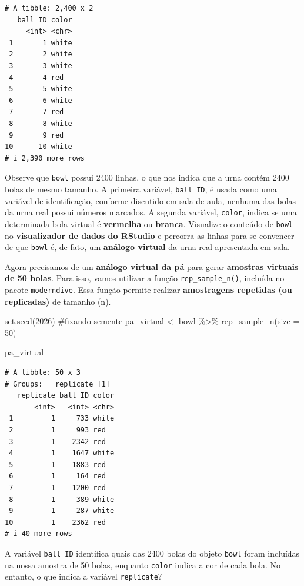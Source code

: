 \documentclass[
  letterpaper,
  DIV=11,
  numbers=noendperiod]{scrreprt}
\newenvironment{Shaded}{\begin{snugshade}}{\end{snugshade}}
\newcommand{\AttributeTok}[1]{\textcolor[rgb]{0.40,0.45,0.13}{#1}}
\newcommand{\CommentTok}[1]{\textcolor[rgb]{0.37,0.37,0.37}{#1}}
\newcommand{\DecValTok}[1]{\textcolor[rgb]{0.68,0.00,0.00}{#1}}
\newcommand{\FunctionTok}[1]{\textcolor[rgb]{0.28,0.35,0.67}{#1}}
\newcommand{\NormalTok}[1]{\textcolor[rgb]{0.00,0.23,0.31}{#1}}
\newcommand{\OtherTok}[1]{\textcolor[rgb]{0.00,0.23,0.31}{#1}}
\newcommand{\SpecialCharTok}[1]{\textcolor[rgb]{0.37,0.37,0.37}{#1}}
\begin{document}
\begin{verbatim}
# A tibble: 2,400 x 2
   ball_ID color
     <int> <chr>
 1       1 white
 2       2 white
 3       3 white
 4       4 red  
 5       5 white
 6       6 white
 7       7 red  
 8       8 white
 9       9 red  
10      10 white
# i 2,390 more rows
\end{verbatim}

Observe que \texttt{bowl} possui 2400 linhas, o que nos indica que a
urna contém 2400 bolas de mesmo tamanho. A primeira variável,
\texttt{ball\_ID}, é usada como uma variável de identificação, conforme
discutido em sala de aula, nenhuma das bolas da urna real possui números
marcados. A segunda variável, \texttt{color}, indica se uma determinada
bola virtual é \textbf{vermelha} ou \textbf{branca}. Visualize o
conteúdo de \texttt{bowl} no \textbf{visualizador de dados do RStudio} e
percorra as linhas para se convencer de que \texttt{bowl} é, de fato, um
\textbf{análogo virtual} da urna real apresentada em sala.

Agora precisamos de um \textbf{análogo virtual da pá} para gerar
\textbf{amostras virtuais de 50 bolas}. Para isso, vamos utilizar a
função \texttt{rep\_sample\_n()}, incluída no pacote
\texttt{moderndive}. Essa função permite realizar \textbf{amostragens
repetidas (ou replicadas)} de tamanho (n).

\begin{Shaded}
\begin{Highlighting}[]
\FunctionTok{set.seed}\NormalTok{(}\DecValTok{2026}\NormalTok{) }\CommentTok{\#fixando semente}
\NormalTok{pa\_virtual }\OtherTok{\textless{}{-}}\NormalTok{ bowl }\SpecialCharTok{\%\textgreater{}\%}
\FunctionTok{rep\_sample\_n}\NormalTok{(}\AttributeTok{size =} \DecValTok{50}\NormalTok{)}

\NormalTok{pa\_virtual}
\end{Highlighting}
\end{Shaded}

\begin{verbatim}
# A tibble: 50 x 3
# Groups:   replicate [1]
   replicate ball_ID color
       <int>   <int> <chr>
 1         1     733 white
 2         1     993 red  
 3         1    2342 red  
 4         1    1647 white
 5         1    1883 red  
 6         1     164 red  
 7         1    1200 red  
 8         1     389 white
 9         1     287 white
10         1    2362 red  
# i 40 more rows
\end{verbatim}

A variável \texttt{ball\_ID} identifica quais das 2400 bolas do objeto
\texttt{bowl} foram incluídas na nossa amostra de 50 bolas, enquanto
\texttt{color} indica a cor de cada bola. No entanto, o que indica a
variável \texttt{replicate}?
\end{document}
